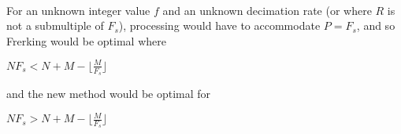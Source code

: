 \documentclass{article}
\begin{document}
        \paragraph{}
        For an unknown integer value $f$ and an unknown decimation rate (or where $R$ is not a submultiple of ${F}_s$), processing would have to accommodate $P = {F}_s$, and so Frerking would be optimal where
        \begin{center}   
        $N{F}_s < N + M - \lfloor{\frac{M}{{F}_s}}\rfloor$
        \end{center}
        and the new method would be optimal for 
        \begin{center}   
        $N{F}_s > N + M - \lfloor{\frac{M}{{F}_s}}\rfloor$
        \end{center}
\end{document}
